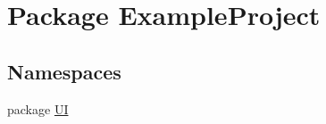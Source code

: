 \hypertarget{namespace_example_project}{}\section{Package Example\+Project}
\label{namespace_example_project}
\subsection*{Namespaces}
\begin{DoxyCompactItemize}
\item 
package \hyperlink{namespace_example_project_1_1_u_i}{U\+I}
\end{DoxyCompactItemize}
